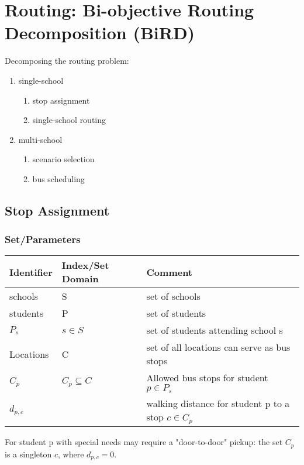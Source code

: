 
\section{Routing: Bi-objective Routing Decomposition (BiRD)}
\label{routing-bi-objective-routing-decomposition-bird}
Decomposing the routing problem:

\begin{enumerate}
\item single-school

\begin{enumerate}
\item stop assignment
\item single-school routing
\end{enumerate}

\item multi-school

\begin{enumerate}
\item scenario selection
\item bus scheduling
\end{enumerate}
\end{enumerate}

\subsection{Stop Assignment}
\label{stop-assignment}
\subsubsection{Set/Parameters}
\label{setparameters}
\begin{center}
\begin{tabular}{lll}
Identifier & Index/Set Domain & Comment\\
\hline
schools & S & set of schools\\
students & P & set of students\\
\(P_s\) & \(s \in S\) & set of students attending school s\\
Locations & C & set of all locations can serve as bus stops\\
\(C_p\) & \(C_p \subseteq C\) & Allowed bus stops for student \(p \in P_s\)\\
\(d_{p,c}\) &  & walking distance for student p to a stop \(c \in C_p\)\\
\end{tabular}
\end{center}

For student p with special needs may require a "door-to-door" pickup:
the set \(C_p\) is a singleton \({c}\), where \(d_{p,c} = 0\).

